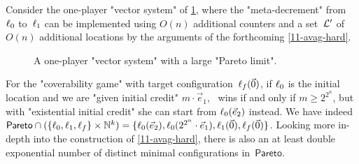 \begin{example}\label{11-ex-pareto}
  Consider the one-player "vector system" of \cref{11-fig-pareto},
  where the "meta-decrement" from~$\ell_0$ to~$\ell_1$ can be
  implemented using $O(n)$ additional counters and a set~$\mathcal L'$ of
  $O(n)$ additional locations by the arguments of the
  forthcoming \cref{11-avag-hard}.
  
  \begin{figure}[htbp]
    \centering
  \caption{\label{11-fig-pareto} A one-player "vector system"
  with a large "Pareto limit".}
  \end{figure}
  For the "coverability game" with target
  configuration~$\ell_f(\vec 0)$, if $\ell_0$ is the initial location
  and we are "given initial credit" $m\cdot\vec e_1$, \Eve\ wins if and
  only if $m\geq 2^{2^n}$, but with "existential initial credit" she
  can start from $\ell_0(\vec e_2)$ instead.  We have indeed
  $\mathsf{Pareto}\cap(\{\ell_0,\ell_1,\ell_f\}\times\mathbb N^k)=\{\ell_0(\vec
  e_2),\ell_0(2^{2^n}\cdot\vec e_1),\ell_1(\vec 0),\ell_f(\vec 0)\}$.
  Looking more in-depth into the construction of \cref{11-avag-hard},
  there is also an at least double exponential number of distinct
  minimal configurations in~$\mathsf{Pareto}$.
\end{example}



